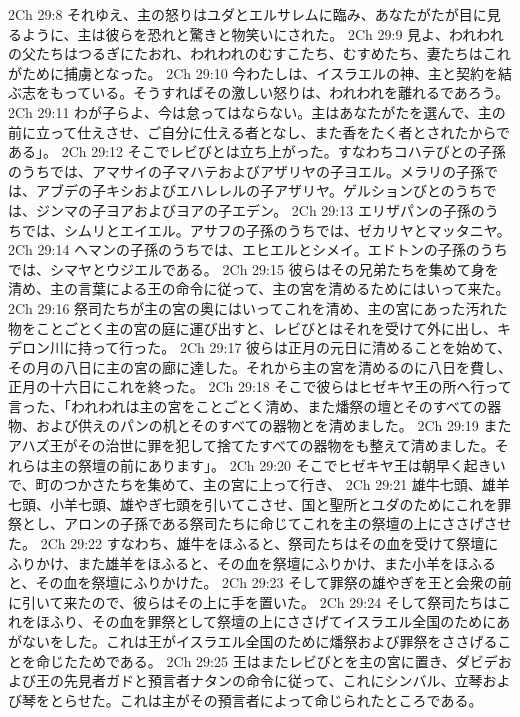 2Ch 29:8  それゆえ、主の怒りはユダとエルサレムに臨み、あなたがたが目に見るように、主は彼らを恐れと驚きと物笑いにされた。
2Ch 29:9  見よ、われわれの父たちはつるぎにたおれ、われわれのむすこたち、むすめたち、妻たちはこれがために捕虜となった。
2Ch 29:10  今わたしは、イスラエルの神、主と契約を結ぶ志をもっている。そうすればその激しい怒りは、われわれを離れるであろう。
2Ch 29:11  わが子らよ、今は怠ってはならない。主はあなたがたを選んで、主の前に立って仕えさせ、ご自分に仕える者となし、また香をたく者とされたからである」。
2Ch 29:12  そこでレビびとは立ち上がった。すなわちコハテびとの子孫のうちでは、アマサイの子マハテおよびアザリヤの子ヨエル。メラリの子孫では、アブデの子キシおよびエハレレルの子アザリヤ。ゲルションびとのうちでは、ジンマの子ヨアおよびヨアの子エデン。
2Ch 29:13  エリザパンの子孫のうちでは、シムリとエイエル。アサフの子孫のうちでは、ゼカリヤとマッタニヤ。
2Ch 29:14  ヘマンの子孫のうちでは、エヒエルとシメイ。エドトンの子孫のうちでは、シマヤとウジエルである。
2Ch 29:15  彼らはその兄弟たちを集めて身を清め、主の言葉による王の命令に従って、主の宮を清めるためにはいって来た。
2Ch 29:16  祭司たちが主の宮の奥にはいってこれを清め、主の宮にあった汚れた物をことごとく主の宮の庭に運び出すと、レビびとはそれを受けて外に出し、キデロン川に持って行った。
2Ch 29:17  彼らは正月の元日に清めることを始めて、その月の八日に主の宮の廊に達した。それから主の宮を清めるのに八日を費し、正月の十六日にこれを終った。
2Ch 29:18  そこで彼らはヒゼキヤ王の所へ行って言った、「われわれは主の宮をことごとく清め、また燔祭の壇とそのすべての器物、および供えのパンの机とそのすべての器物とを清めました。
2Ch 29:19  またアハズ王がその治世に罪を犯して捨てたすべての器物をも整えて清めました。それらは主の祭壇の前にあります」。
2Ch 29:20  そこでヒゼキヤ王は朝早く起きいで、町のつかさたちを集めて、主の宮に上って行き、
2Ch 29:21  雄牛七頭、雄羊七頭、小羊七頭、雄やぎ七頭を引いてこさせ、国と聖所とユダのためにこれを罪祭とし、アロンの子孫である祭司たちに命じてこれを主の祭壇の上にささげさせた。
2Ch 29:22  すなわち、雄牛をほふると、祭司たちはその血を受けて祭壇にふりかけ、また雄羊をほふると、その血を祭壇にふりかけ、また小羊をほふると、その血を祭壇にふりかけた。
2Ch 29:23  そして罪祭の雄やぎを王と会衆の前に引いて来たので、彼らはその上に手を置いた。
2Ch 29:24  そして祭司たちはこれをほふり、その血を罪祭として祭壇の上にささげてイスラエル全国のためにあがないをした。これは王がイスラエル全国のために燔祭および罪祭をささげることを命じたためである。
2Ch 29:25  王はまたレビびとを主の宮に置き、ダビデおよび王の先見者ガドと預言者ナタンの命令に従って、これにシンバル、立琴および琴をとらせた。これは主がその預言者によって命じられたところである。
